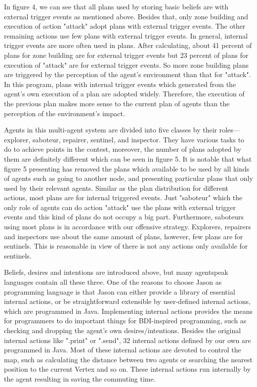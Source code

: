 In figure 4, we can see that all plans used by storing basic beliefs are with external trigger events as mentioned above. Besides that, only zone building and execution of action "attack" adopt plans with external trigger events. The other remaining actions use few plans with external trigger events. In general, internal trigger events are more often used in plans. After calculating, about 41 percent of plans for zone building are for external trigger events but 23 percent of plans for execution of "attack" are for external trigger events. So more zone building plans are triggered by the perception of the agent’s environment than that for "attack". In this program, plans with internal trigger events which generated from the agent’s own execution of a plan are adopted widely. Therefore, the execution of the previous plan makes more sense to the current plan of agents than the perception of the environment's impact.

Agents in this multi-agent system are divided into five classes by their roles---explorer, saboteur, repairer, sentinel, and inspector. They have various tasks to do to achieve points in the contest, moreover, the number of plans adopted by them are definitely different which can be seen in figure 5. It is notable that what figure 5 presenting has removed the plans which available to be used by all kinds of agents such as going to another node, and presenting particular plans that only used by their relevant agents. Similar as the plan distribution for different actions, most plans are for internal triggered events. Just "saboteur" which the only role of agents can do action "attack" use the plans with external trigger events and this kind of plans do not occupy a big part.
Furthermore, saboteurs using most plans is in accordance with our offensive strategy. Explorers, repairers and inspectors use about the same amount of plans, however, few plans are for sentinels. This is reasonable in view of there is not any actions only available for sentinels.

Beliefs, desires and intentions are introduced above, but many agentspeak languages contain all these three. One of the reasons to choose Jason as programming language is that Jason can either provide a library of essential internal actions, or be straightforward extensible by user-defined internal actions, which are programmed in Java\cite{rafael_Javabased_2007}. Implementing internal actions provides the means for programmers to do important things for BDI-inspired programming, such as checking and dropping the agent’s own
desires/intentions\cite{rafael_overviewjason_2006}. Besides the original internal actions like ".print" or ".send", 32 internal actions defined by our own are programmed in Java. Most of these internal actions are devoted to control the map, such as calculating the distance between two agents or searching the nearest position to the current Vertex and so on. These internal actions run internally by the agent resulting in saving the commuting time.

